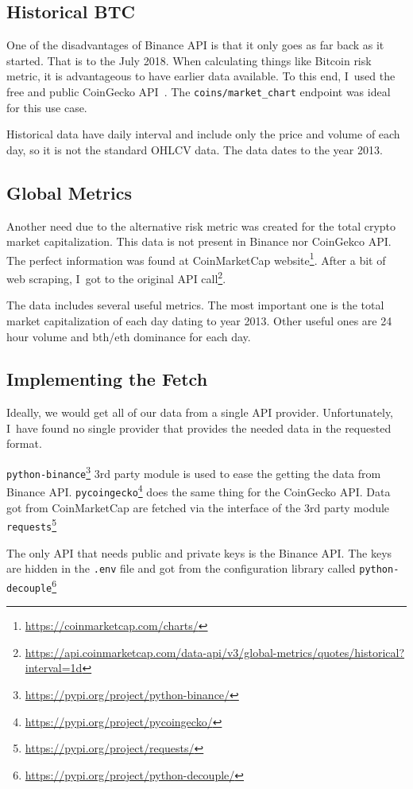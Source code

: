 \subsection*{Historical BTC}
One of the disadvantages of Binance API is that it only goes as far back as it started. That is to the July 2018. When calculating things like Bitcoin risk metric, it is advantageous to have earlier data available. To this end, I~used the free and public CoinGecko API~\cite{coingecko:documentation}. The \texttt{coins/market\_chart} endpoint was ideal for this use case.

Historical data have daily interval and include only the price and volume of each day, so it is not the standard OHLCV data. The data dates to the year 2013.

\subsection*{Global Metrics}
Another need due to the alternative risk metric was created for the total crypto market capitalization. This data is not present in Binance nor CoinGekco API. The perfect information was found at CoinMarketCap website\footnote{\url{https://coinmarketcap.com/charts/}}. After a bit of web scraping, I~got to the original API call\footnote{\url{https://api.coinmarketcap.com/data-api/v3/global-metrics/quotes/historical?interval=1d}}.

The data includes several useful metrics. The most important one is the total market capitalization of each day dating to year 2013. Other useful ones are 24 hour volume and bth/eth dominance for each day.

\subsection*{Implementing the Fetch}
Ideally, we would get all of our data from a single API provider. Unfortunately, I~have found no single provider that provides the needed data in the requested format.

\texttt{python-binance}\footnote{\url{https://pypi.org/project/python-binance/}} 3rd party module is used to ease the getting the data from Binance API. \texttt{pycoingecko}\footnote{\url{https://pypi.org/project/pycoingecko/}} does the same thing for the CoinGecko API. Data got from CoinMarketCap are fetched via the interface of the 3rd party module \texttt{requests}\footnote{\url{https://pypi.org/project/requests/}}

The only API that needs public and private keys is the Binance API. The keys are hidden in the \texttt{.env} file and got from the configuration library called \texttt{python-decouple}\footnote{\url{https://pypi.org/project/python-decouple/}}

